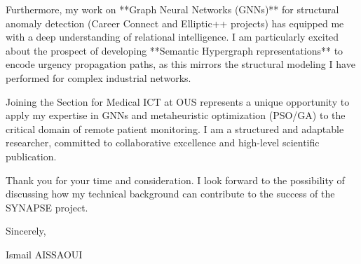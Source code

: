 \documentclass[a4paper,11pt]{letter}
\begin{document}
Furthermore, my work on **Graph Neural Networks (GNNs)** for structural anomaly detection (Career Connect and Elliptic++ projects) has equipped me with a deep understanding of relational intelligence. I am particularly excited about the prospect of developing **Semantic Hypergraph representations** to encode urgency propagation paths, as this mirrors the structural modeling I have performed for complex industrial networks.

Joining the Section for Medical ICT at OUS represents a unique opportunity to apply my expertise in GNNs and metaheuristic optimization (PSO/GA) to the critical domain of remote patient monitoring. I am a structured and adaptable researcher, committed to collaborative excellence and high-level scientific publication.

Thank you for your time and consideration. I look forward to the possibility of discussing how my technical background can contribute to the success of the SYNAPSE project.

Sincerely,

\bigskip

Ismail AISSAOUI
\end{document}
